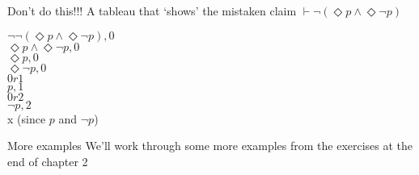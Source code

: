\documentclass[
  14pt,
  letterpaper,
  ignorenonframetext,
  aspectratio=169,
  handout]{beamer}
\begin{document}
\begin{frame}{Don't do this!!!}
\protect\hypertarget{dont-do-this}{}
A tableau that `shows' the mistaken claim
\(\vdash \neg(\Diamond p \wedge \Diamond \neg p)\)

\begin{center}
$\neg \neg(\Diamond p \wedge \Diamond \neg p), 0$ \\
$\Diamond p \wedge \Diamond \neg p, 0$ \\
$\Diamond p, 0$ \\
$\Diamond \neg p, 0$ \\
$0r1$ \\
$p, 1$ \\
$0r2$ \\
$\neg p, 2$ \\
x (since $p$ and $\neg p$)
\end{center}
\end{frame}

\begin{frame}{More examples}
\protect\hypertarget{more-examples}{}
We'll work through some more examples from the exercises at the end of
chapter 2
\end{frame}
\end{document}
